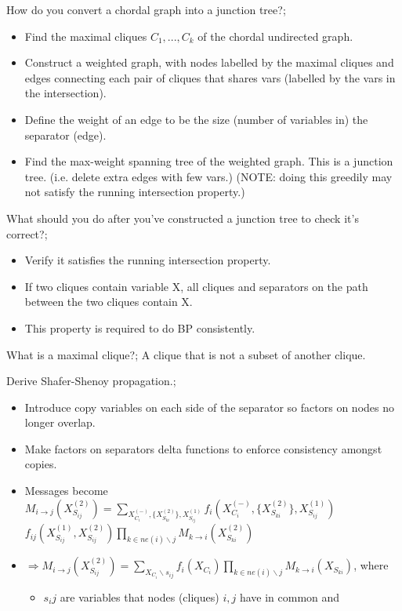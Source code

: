 \documentclass{article}
\begin{document}
How do you convert a chordal graph into a junction tree?; \begin{itemize}
    \item Find the maximal cliques $C_1,...,C_k$ of the chordal undirected graph.
    \item Construct a weighted graph, with nodes labelled by the maximal cliques and edges connecting each pair of cliques that shares vars (labelled by the vars in the intersection).
    \item Define the weight of an edge to be the size (number of variables in) the separator (edge).
    \item Find the max-weight spanning tree of the weighted graph. This is a junction tree. (i.e. delete extra edges with few vars.) (NOTE: doing this greedily may not satisfy the running intersection property.)
\end{itemize}

What should you do after you've constructed a junction tree to check it's correct?; \begin{itemize}
    \item Verify it satisfies the running intersection property.
    \item If two cliques contain variable X, all cliques and separators on the path between the two cliques contain X.
    \item This property is required to do BP consistently.
\end{itemize}

What is a maximal clique?; A clique that is not a subset of another clique.

Derive Shafer-Shenoy propagation.; \begin{itemize}
    \item Introduce copy variables on each side of the separator so factors on nodes no longer overlap.
    \item Make factors on separators delta functions to enforce consistency amongst copies.
    \item Messages become $M_{i\rightarrow j}(X^{(2)}_{S_{ij}})=\sum_{X^{(-)}_{C_i},\{X_{S_{ki}}^{(2)}\},X^{(1)}_{S_{ij}}}f_i(X^{(-)}_{C_i},\{X_{S_{ki}}^{(2)}\},X^{(1)}_{S_{ij}})$\newline$f_{ij}(X^{(1)}_{S_{ij}},X^{(2)}_{S_{ij}})
    \prod_{k\in ne(i)\backslash j}M_{k\rightarrow i}(X^{(2)}_{S_{ki}})$
    \item $\Rightarrow M_{i\rightarrow j}(X^{(2)}_{S_{ij}})=\sum_{X_{C_i}\backslash s_{ij}}f_i(X_{C_i})\prod_{k\in ne(i)\backslash j}M_{k\rightarrow i}(X_{S_{ki}})$, where \begin{itemize}
    \item $s_ij$ are variables that nodes (cliques) $i, j$ have in common and
    \end{itemize}
\end{itemize}
\end{document}
